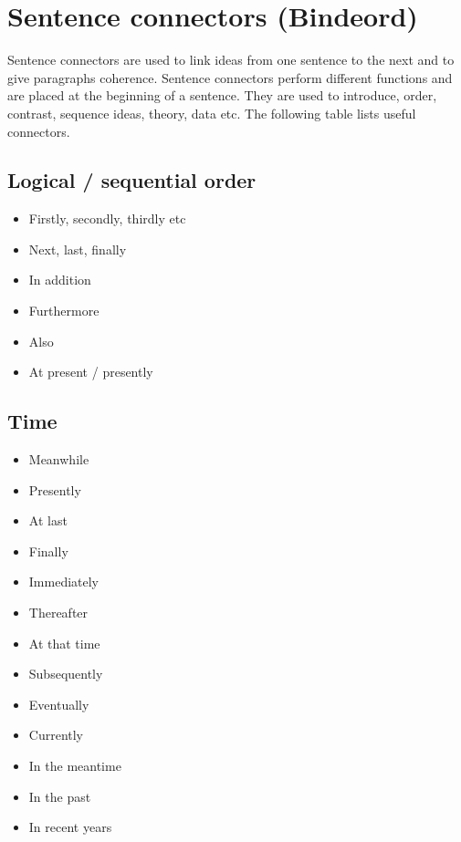 \section{Sentence connectors (Bindeord)}

Sentence connectors are used to link ideas from one sentence to the next and to give paragraphs coherence. Sentence connectors perform different functions and are placed at the beginning of a sentence. They are used to introduce, order, contrast, sequence ideas, theory, data etc. The following table lists useful connectors.

\subsection{Logical / sequential order}
\begin{itemize}
    \item Firstly, secondly, thirdly etc
    \item Next, last, finally
    \item In addition
    \item Furthermore
    \item Also
    \item At present / presently
\end{itemize}

\subsection{Time}
\begin{itemize}
    \item Meanwhile
    \item Presently
    \item At last
    \item Finally
    \item Immediately
    \item Thereafter
    \item At that time
    \item Subsequently
    \item Eventually
    \item Currently
    \item In the meantime
    \item In the past
    \item In recent years
\end{itemize}

